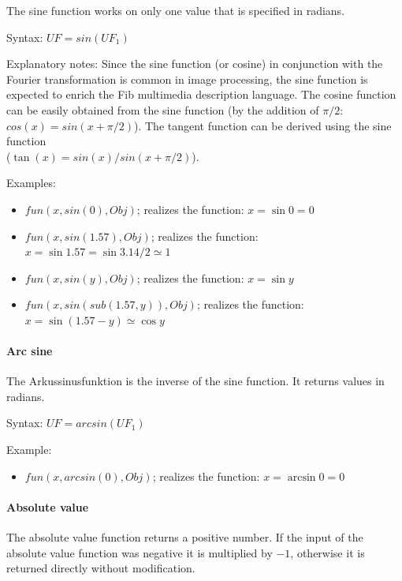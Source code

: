 The sine function works on only one value that is specified in radians.

\bigskip\noindent
Syntax:
$UF=sin(UF_1)$

\bigskip\noindent
Explanatory notes:
Since the sine function (or cosine) in conjunction with the Fourier transformation is common in image processing, the sine function is expected to enrich the Fib multimedia description language. The cosine function can be easily obtained from the sine function (by the addition of $\pi/2$: $cos{(x)}=sin{(x+\pi/2)}$). The tangent function can be derived using the sine function\\ ($\tan{(x)}=sin{(x)}/sin{(x+\pi/2)}$).

\bigskip\noindent
Examples:
\begin{itemize}
 \item $fun(x, sin(0), Obj)$; realizes the function: $x=\sin{0}=0$
 \item $fun(x, sin(1.57), Obj)$; realizes the function: $x=\sin{1.57}=\sin{3.14/2} \simeq 1$
 \item $fun(x, sin(y), Obj)$; realizes the function: $x=\sin{y}$
 \item $fun(x, sin( sub( 1.57, y ) ), Obj)$; realizes the function: $x=\sin{(1.57 - y)} \simeq \cos{y}$
\end{itemize}


\paragraph{Arc sine}

The Arkussinusfunktion is the inverse of the sine function. It returns values in radians.

\bigskip\noindent
Syntax:
$UF=arcsin( UF_1 )$

\bigskip\noindent
Example:
\begin{itemize}
 \item $fun(x, arcsin(0), Obj)$; realizes the function: $x=\arcsin{0}=0$
\end{itemize}


\paragraph{Absolute value}

The absolute value function returns a positive number. If the input of the absolute value function was negative it is multiplied by $-1$, otherwise it is returned directly without modification.

